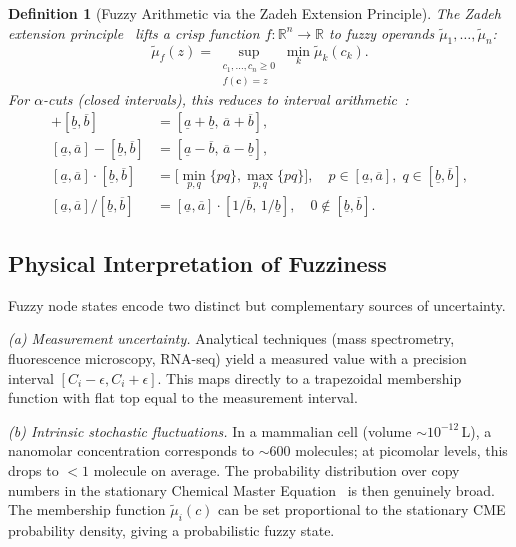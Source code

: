 \documentclass[twocolumn,10pt,a4paper]{article}
\newtheorem{definition}[theorem]{Definition}
\begin{document}
\begin{definition}[Fuzzy Arithmetic via the Zadeh Extension Principle]
\label{def:extension}
The Zadeh extension principle~\cite{Zadeh1965,Zadeh1978} lifts a crisp function
$f:\mathbb{R}^n\to\mathbb{R}$ to fuzzy operands
$\tilde{\mu}_1,\ldots,\tilde{\mu}_n$:
\begin{equation}
  \tilde{\mu}_f(z) = \sup_{\substack{c_1,\ldots,c_n\geq 0\\f(\mathbf{c})=z}}
    \min_{k}\tilde{\mu}_k(c_k).
  \label{eq:extension}
\end{equation}
For $\alpha$-cuts (closed intervals), this reduces to interval
arithmetic~\cite{Zimmermann2001book}:
\begin{align}
  [\underline{a},\overline{a}]+[\underline{b},\overline{b}]
    &=[\underline{a}+\underline{b},\,\overline{a}+\overline{b}], \label{eq:ia-add}\\
  [\underline{a},\overline{a}]-[\underline{b},\overline{b}]
    &=[\underline{a}-\overline{b},\,\overline{a}-\underline{b}], \label{eq:ia-sub}\\
  [\underline{a},\overline{a}]\cdot[\underline{b},\overline{b}]
    &=\bigl[\min_{p,q}\{pq\},\max_{p,q}\{pq\}\bigr],\quad p\in[\underline{a},\overline{a}],\;
      q\in[\underline{b},\overline{b}], \label{eq:ia-mul}\\
  [\underline{a},\overline{a}]/[\underline{b},\overline{b}]
    &=[\underline{a},\overline{a}]\cdot[1/\overline{b},\,1/\underline{b}],
    \quad 0\notin[\underline{b},\overline{b}]. \label{eq:ia-div}
\end{align}
\end{definition}

\subsection{Physical Interpretation of Fuzziness}
\label{sec:fuzzy-physical}

Fuzzy node states encode two distinct but complementary sources of uncertainty.

\emph{(a) Measurement uncertainty.}  Analytical techniques (mass spectrometry,
fluorescence microscopy, RNA-seq) yield a measured value with a precision
interval $[C_i-\epsilon,C_i+\epsilon]$.  This maps directly to a trapezoidal
membership function with flat top equal to the measurement interval.

\emph{(b) Intrinsic stochastic fluctuations.}  In a mammalian cell
(volume $\sim 10^{-12}$\,L), a nanomolar concentration corresponds to
$\sim 600$ molecules; at picomolar levels, this drops to $<1$ molecule on
average.  The probability distribution over copy numbers in the stationary
Chemical Master Equation~\cite{vanKampen2007,Gillespie1977} is then genuinely
broad.  The membership function $\tilde{\mu}_i(c)$ can be set proportional to
the stationary CME probability density, giving a probabilistic fuzzy state.
\end{document}
